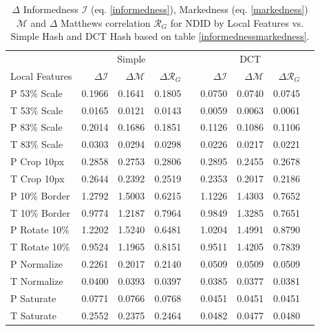 \documentclass[english,12pt,a4paper,pdftex,elec,utf8, table]{aaltothesis}
\begin{document}
\begin{table} \footnotesize
\caption{ $\Delta$ Informedness $\mathcal{I}$ (eq. \ref{informedness}), Markedness (eq. \ref{markedness}) $\mathcal{M}$ and $\Delta$ Matthews correlation $\mathcal{R}_G$ for NDID by Local Features vs. Simple Hash and DCT Hash based on table \ref{informednessmarkedness}.}
\label{deltainformednessmarkedness}
\begin{center}
  \setlength\tabcolsep{3pt} %
  \begin{tabular}{@{}lrrrrrrrr@{}}
    \toprule
    & \multicolumn{3}{c}{Simple} &\phantom{abc} &\multicolumn{3}{c}{DCT} &\phantom{abc}\\
\cmidrule{2-4} \cmidrule{6-8}
 Local Features  & $\Delta\mathcal{I}$ & $\Delta\mathcal{M}$ & $\Delta\mathcal{R}_G$&\phantom{abc} & $\Delta\mathcal{I}$ & $\Delta\mathcal{M}$ & $\Delta\mathcal{R}_G$\\ \midrule
 P 53\% Scale   & 0.1966  & 0.1641 & 0.1805 &\phantom{abc} & 0.0750 & 0.0740 & 0.0745\\
 T 53\% Scale   & 0.0165  & 0.0121 & 0.0143 &\phantom{abc} & 0.0059 & 0.0063 & 0.0061\\
 P 83\% Scale   & 0.2014  & 0.1686 & 0.1851 &\phantom{abc} & 0.1126 & 0.1086 & 0.1106\\
 T 83\% Scale   & 0.0303  & 0.0294 & 0.0298 &\phantom{abc} & 0.0226 & 0.0217 & 0.0221\\
 P Crop 10px    & 0.2858  & 0.2753 & 0.2806 &\phantom{abc} & 0.2895 & 0.2455 & 0.2678\\
 T Crop 10px    & 0.2644  & 0.2392 & 0.2519 &\phantom{abc} & 0.2353 & 0.2017 & 0.2186\\
 P 10\% Border  & 1.2792  & 1.5003 & 0.6215 &\phantom{abc} & 1.1226 & 1.4303 & 0.7652\\
 T 10\% Border  & 0.9774  & 1.2187 & 0.7964 &\phantom{abc} & 0.9849 & 1.3285 & 0.7651\\
 P Rotate 10\%  & 1.2202  & 1.5240 & 0.6481 &\phantom{abc} & 1.0204& 1.4991 & 0.8790\\
 T Rotate 10\%  & 0.9524  & 1.1965 & 0.8151 &\phantom{abc} & 0.9511 & 1.4205 & 0.7839\\
 P Normalize    & 0.2261  & 0.2017 & 0.2140 &\phantom{abc} & 0.0509 & 0.0509 & 0.0509\\
 T Normalize    & 0.0400  & 0.0393 & 0.0397 &\phantom{abc} & 0.0385 & 0.0377 & 0.0381\\
 P Saturate     & 0.0771  & 0.0766 & 0.0768 &\phantom{abc} & 0.0451 & 0.0451 & 0.0451 \\
 T Saturate     & 0.2552  & 0.2375 & 0.2464 &\phantom{abc} & 0.0482 & 0.0477& 0.0480\\
    \bottomrule
\end{tabular}
\end{center}\end{table}
\end{document}
